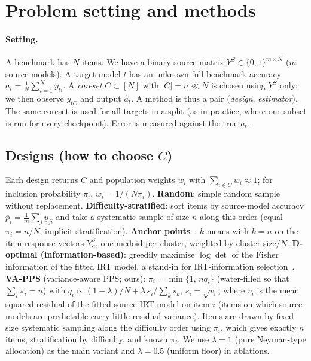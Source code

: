 \section{Problem setting and methods}
\label{sec:method}
\paragraph{Setting.}
A benchmark has $N$ items. We have a binary source matrix $Y^S\in\{0,1\}^{m\times N}$ ($m$ source models). A target model $t$ has an unknown full-benchmark accuracy $a_t=\frac1N\sum_{i=1}^N y_{ti}$. A \emph{coreset} $C\subset[N]$ with $|C|=n\ll N$ is chosen using $Y^S$ only; we then observe $y_{tC}$ and output $\hat a_t$. A method is thus a pair (\emph{design}, \emph{estimator}). The same coreset is used for all targets in a split (as in practice, where one subset is run for every checkpoint). Error is measured against the true $a_t$.

\subsection{Designs (how to choose $C$)}
Each design returns $C$ and population weights $w_i$ with $\sum_{i\in C}w_i\approx1$; for inclusion probability $\pi_i$, $w_i=1/(N\pi_i)$.
\textbf{Random}: simple random sample without replacement.
\textbf{Difficulty-stratified}: sort items by source-model accuracy $\bar p_i=\frac1m\sum_j y_{ji}$ and take a systematic sample of size $n$ along this order (equal $\pi_i=n/N$; implicit stratification).
\textbf{Anchor points}~\citep{vivek2024anchor}: $k$-means with $k=n$ on the item response vectors $Y^S_{\cdot i}$, one medoid per cluster, weighted by cluster size$/N$.
\textbf{D-optimal (information-based)}: greedily maximise $\log\det$ of the Fisher information of the fitted IRT model, a stand-in for IRT-information selection~\citep{kipnis2025metabench}.
\textbf{VA-PPS} (variance-aware PPS; ours): $\pi_i=\min\{1,\,n q_i\}$ (water-filled so that $\sum_i\pi_i=n$) with $q_i\propto(1-\lambda)/N+\lambda\, s_i/\sum_k s_k$, $s_i=\sqrt{v_i}$, where $v_i$ is the mean squared residual of the fitted source IRT model on item $i$ (items on which source models are predictable carry little residual variance). Items are drawn by fixed-size systematic sampling along the difficulty order using $\pi_i$, which gives exactly $n$ items, stratification by difficulty, and known $\pi_i$. We use $\lambda=1$ (pure Neyman-type allocation) as the main variant and $\lambda=0.5$ (uniform floor) in ablations.

